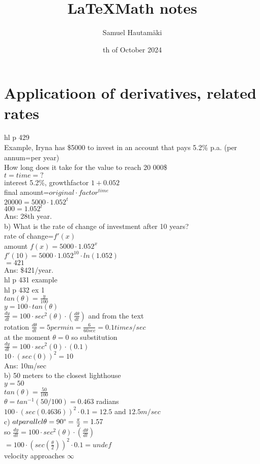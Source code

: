 \documentclass{article}
\title{\LaTeX Math notes}
\author{Samuel Hautamäki}
\date{th of October 2024}
\begin{document}
  \maketitle
   
  \section{Applicatioon of derivatives, related rates}
  hl p 429\\
  Example, Iryna has \$5000 to invest in an account that pays 5.2\% p.a. (per annum=per year)\\
  How long does it take for the value to reach 20 000\$\\
  $t=time=?$\\
  interest 5.2\%, growthfactor $1+0.052$\\
  final amount=$original\cdot factor^{time}$\\
  $20 000=5000\cdot 1.052^t$\\
  $400=1.052^t$\\
  Ans: 28th year.\\
  b) What is the rate of change of investment after 10 years?\\
  rate of change=$f'(x)$\\
  amount $f(x)=5000\cdot1.052^x$\\
  $f'(10)=5000\cdot 1.052^{10}\cdot ln(1.052)$\\
  $=421$\\
  Ans: \$421/year.\\
  hl p 431 example\\
  hl p 432 ex 1\\
  $tan(\theta)=\frac{y}{100}$\\
  $y=100\cdot tan(\theta)$\\
  $\frac{dy}{dt}=100\cdot sec^2(\theta)\cdot(\frac{d\theta}{dt})$ and from the text\\ 
  rotation $\frac{d\theta}{dt}=5per min=\frac{6}{60 sec}=0.1 times/sec$\\
  at the moment $\theta=0$ so substitution\\
  $\frac{dy}{dt}=100\cdot sec^2(0)\cdot(0.1)$\\
  $10\cdot(sec(0))^2=10$\\
  Ans: 10m/sec\\
  b) 50 meters to the closest lighthouse\\
  $y=50$\\
  $tan(\theta)=\frac{50}{100}$\\
  $\theta=tan^{-1}(50/100)=0.463$ radians\\
  $100\cdot (sec(0.4636))^2\cdot0.1=12.5$
  and $12.5 m/sec$\\
  c) $at parallel \theta=90\degree=\frac{\pi}{2}=1.57$\\
  so $\frac{dy}{dt}=100\cdot sec^2(\theta)\cdot(\frac{d\theta}{dt})$\\
  $=100\cdot(sec(\frac{\theta}{2}))^2\cdot0.1=undef$\\
  velocity approaches $\infty$\\
  
     
\end{document}
